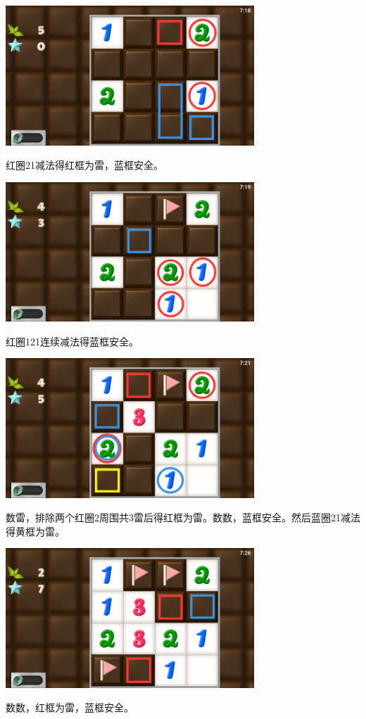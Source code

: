 \subsection{} %
\begin{center}
    \includegraphics[width=0.7\textwidth]{puzzle/41-1.png}
\end{center}
红圈21减法得红框为雷，蓝框安全。
\begin{center}
    \includegraphics[width=0.7\textwidth]{puzzle/41-2.png}
\end{center}
红圈121连续减法得蓝框安全。
\begin{center}
    \includegraphics[width=0.7\textwidth]{puzzle/41-3.png}
\end{center}
数雷，排除两个红圈2周围共3雷后得红框为雷。数数，蓝框安全。然后蓝圈21减法得黄框为雷。
\begin{center}
    \includegraphics[width=0.7\textwidth]{puzzle/41-4.png}
\end{center}
数数，红框为雷，蓝框安全。

